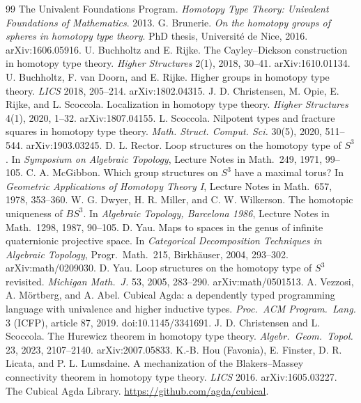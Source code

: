 \documentclass[11pt]{article}
\theoremstyle{definition}
\theoremstyle{remark}
\begin{document}
\begin{thebibliography}{99}
 The Univalent Foundations Program. \emph{Homotopy Type Theory: Univalent Foundations of Mathematics}. 2013.
 G. Brunerie. \emph{On the homotopy groups of spheres in homotopy type theory}. PhD thesis, Universit\'e de Nice, 2016. arXiv:1606.05916.
 U. Buchholtz and E. Rijke. The Cayley--Dickson construction in homotopy type theory. \emph{Higher Structures} 2(1), 2018, 30--41. arXiv:1610.01134.
 U. Buchholtz, F. van Doorn, and E. Rijke. Higher groups in homotopy type theory. \emph{LICS} 2018, 205--214. arXiv:1802.04315.
 J. D. Christensen, M. Opie, E. Rijke, and L. Scoccola. Localization in homotopy type theory. \emph{Higher Structures} 4(1), 2020, 1--32. arXiv:1807.04155.
 L. Scoccola. Nilpotent types and fracture squares in homotopy type theory. \emph{Math. Struct. Comput. Sci.} 30(5), 2020, 511--544. arXiv:1903.03245.
 D. L. Rector. Loop structures on the homotopy type of $S^3$. In \emph{Symposium on Algebraic Topology}, Lecture Notes in Math.\ 249, 1971, 99--105.
 C. A. McGibbon. Which group structures on $S^3$ have a maximal torus? In \emph{Geometric Applications of Homotopy Theory I}, Lecture Notes in Math.\ 657, 1978, 353--360.
 W. G. Dwyer, H. R. Miller, and C. W. Wilkerson. The homotopic uniqueness of $BS^3$. In \emph{Algebraic Topology, Barcelona 1986}, Lecture Notes in Math.\ 1298, 1987, 90--105.
 D. Yau. Maps to spaces in the genus of infinite quaternionic projective space. In \emph{Categorical Decomposition Techniques in Algebraic Topology}, Progr.\ Math.\ 215, Birkh\"auser, 2004, 293--302. arXiv:math/0209030.
 D. Yau. Loop structures on the homotopy type of $S^3$ revisited. \emph{Michigan Math.\ J.} 53, 2005, 283--290. arXiv:math/0501513.
 A. Vezzosi, A. M\"ortberg, and A. Abel. Cubical Agda: a dependently typed programming language with univalence and higher inductive types. \emph{Proc.\ ACM Program.\ Lang.} 3 (ICFP), article 87, 2019. doi:10.1145/3341691.
 J. D. Christensen and L. Scoccola. The Hurewicz theorem in homotopy type theory. \emph{Algebr.\ Geom.\ Topol.} 23, 2023, 2107--2140. arXiv:2007.05833.
 K.-B. Hou (Favonia), E. Finster, D. R. Licata, and P. L. Lumsdaine. A mechanization of the Blakers--Massey connectivity theorem in homotopy type theory. \emph{LICS} 2016. arXiv:1605.03227.
 The Cubical Agda Library. \url{https://github.com/agda/cubical}.
\end{thebibliography}
\end{document}
